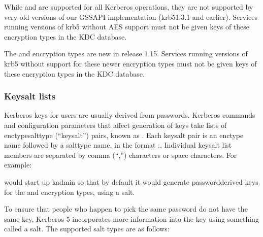 \documentclass[letterpaper,10pt,english]{sphinxmanual}
\begin{document}
\sphinxAtStartPar
While  and  are supported for all Kerberos
operations, they are not supported by very old versions of our GSSAPI
implementation (krb5\sphinxhyphen{}1.3.1 and earlier).  Services running versions of
krb5 without AES support must not be given keys of these encryption
types in the KDC database.

\sphinxAtStartPar
The  and  encryption types are new in
release 1.15.  Services running versions of krb5 without support for
these newer encryption types must not be given keys of these
encryption types in the KDC database.


\subsubsection{Keysalt lists}
\label{\detokenize{admin/conf_files/kdc_conf:keysalt-lists}}\label{\detokenize{admin/conf_files/kdc_conf:id7}}
\sphinxAtStartPar
Kerberos keys for users are usually derived from passwords.  Kerberos
commands and configuration parameters that affect generation of keys
take lists of enctype\sphinxhyphen{}salttype (“keysalt”) pairs, known as .  Each keysalt pair is an enctype name followed by a salttype
name, in the format :.  Individual keysalt list members are
separated by comma (“,”) characters or space characters.  For example:

\begin{sphinxVerbatim}[commandchars=\\\{\}]
  
\end{sphinxVerbatim}

\sphinxAtStartPar
would start up kadmin so that by default it would generate
password\sphinxhyphen{}derived keys for the  and 
encryption types, using a  salt.

\sphinxAtStartPar
To ensure that people who happen to pick the same password do not have
the same key, Kerberos 5 incorporates more information into the key
using something called a salt.  The supported salt types are as
follows:
\end{document}
